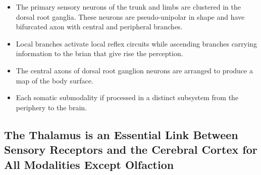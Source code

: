 \documentclass[12pt,a4paper]{article}
\begin{document}
\begin{itemize}
    \item The primary sensory neurons of the trunk and limbs are clustered in the dorsal root ganglia. These neurons are pseudo-unipolar in shape and have bifurcated axon with central and peripheral branches.
    \item Local branches activate local reflex circuits while ascending branches carrying information to the brian that give rise the perception.
    \item The central axons of dorsal root ganglion neurons are arranged to produce a map of the body surface.
    \item Each somatic submodality if processed in a distinct subsystem from the periphery to the brain.
\end{itemize}

\subsection{The Thalamus is an Essential Link Between Sensory Receptors and the Cerebral Cortex for All Modalities Except Olfaction}
\end{document}
